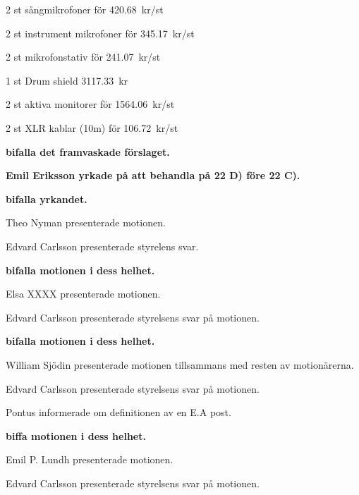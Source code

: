 \documentclass[10pt]{article}
\begin{document}
\begin{paragrafer}
\begin{paragrafer}
      \begin{dashlist}
        \item 2 st sångmikrofoner för \SI{420,68}{kr/st} 
        \item 2 st instrument mikrofoner för \SI{345,17}{kr/st} 
        \item 2 st mikrofonstativ för \SI{241,07}{kr/st} 
        \item 1 st Drum shield \SI{3117,33}{kr} 
        \item 2 st aktiva monitorer för \SI{1564,06}{kr/st}
        \item 2 st XLR kablar (10m) för \SI{106,72}{kr/st}
      \end{dashlist}

      \textbf{\Mba bifalla det framvaskade förslaget.}


      \textbf{Emil Eriksson yrkade på att behandla på 22 D) före 22 C).} 
      
      \textbf{\Mba bifalla yrkandet.}


      Theo Nyman presenterade motionen. 

      Edvard Carlsson presenterade styrelens svar. 

      \textbf{\Mba bifalla motionen i dess helhet.}


      Elsa XXXX presenterade motionen. 

      Edvard Carlsson presenterade styrelsens svar på motionen. 
      
      \textbf{\Mba bifalla motionen i dess helhet.}


      William Sjödin presenterade motionen tillsammans med resten av motionärerna. 

      Edvard Carlsson presenterade styrelsens svar på motionen. 

      Pontus informerade om definitionen av en E.A post. 

      \textbf{\Mba biffa motionen i dess helhet.}


      Emil P. Lundh presenterade motionen. 

      Edvard Carlsson presenterade styrelsens svar på motionen. 


\end{paragrafer}
\end{paragrafer}
\end{document}
